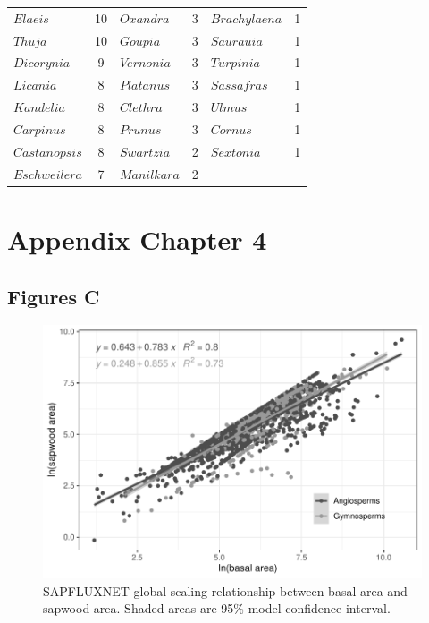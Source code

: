 \documentclass[11pt,twoside]{reedthesis}
\begin{document}
\begin{table}[H]
\begin{tabular}[t]{lclclc}
$Elaeis$ & 10 & $Oxandra$ & 3 & $Brachylaena$ & 1\\
$Thuja$ & 10 & $Goupia$ & 3 & $Saurauia$ & 1\\
$Dicorynia$ & 9 & $Vernonia$ & 3 & $Turpinia$ & 1\\
$Licania$ & 8 & $Platanus$ & 3 & $Sassafras$ & 1\\
$Kandelia$ & 8 & $Clethra$ & 3 & $Ulmus$ & 1\\
$Carpinus$ & 8 & $Prunus$ & 3 & $Cornus$ & 1\\
$Castanopsis$ & 8 & $Swartzia$ & 2 & $Sextonia$ & 1\\
$Eschweilera$ & 7 & $Manilkara$ & 2 &  & \\
\bottomrule
\end{tabular}
\end{table}\newpage
\chapter{Appendix Chapter 4}\label{appendix-chapter-4}

\newpage

\section{Figures C}\label{figures-c}

\setlength{\abovecaptionskip}{15pt}
\begin{figure}[H]

{\centering \includegraphics[width=1\linewidth]{figure/appendixC/dbh_sw} 

}

\caption[SAPFLUXNET global scaling relationship between basal area and sapwood area. Shaded areas are 95\% model confidence interval.]{SAPFLUXNET global scaling relationship between basal area and sapwood area. Shaded areas are 95\% model confidence interval.}\label{fig:unnamed-chunk-8}
\end{figure}
\setlength{\abovecaptionskip}{0pt}
\end{document}
